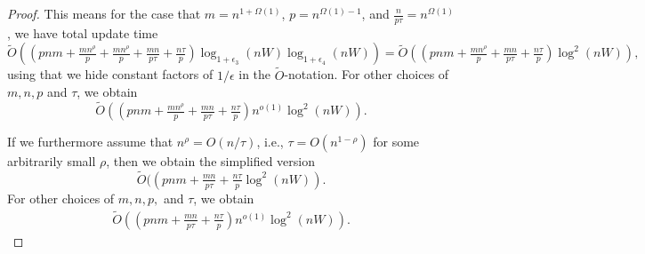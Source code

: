 \documentclass[11pt]{article}
\theoremstyle{definition}
\theoremstyle{remark}
\begin{document}
\begin{proof}
This means for the case that $m=n^{1+\Omega(1)}$, $p=n^{\Omega(1)-1}$, and $\tfrac{n}{p\tau}=n^{\Omega(1)}$, we have total update time
$$ \tilde O ((pnm + \tfrac{mn^\rho}{p}+\tfrac{mn^{\rho}}{p}  + \tfrac{m n }{p\tau}+\tfrac{n\tau}{ p})\log_{1+\epsilon_3}(nW)\log_{1+\epsilon_4}(nW)) = \tilde O ((pnm + \tfrac{mn^{\rho}}{p} + \tfrac{m n }{p\tau}+\tfrac{n\tau}{ p})\log^2(nW)), $$
using that we hide constant factors of $1/\epsilon$ in the $\tilde O$-notation. 
For other choices of $m,n,p$ and $\tau$, we obtain 
$$ \tilde O ((pnm + \tfrac{mn^{\rho}}{p} + \tfrac{m n }{p\tau}+\tfrac{n\tau}{ p})n^{o(1)}\log^2(nW)). $$

If we furthermore assume that $n^\rho = O(n/\tau)$, i.e., $\tau = O(n^{1-\rho})$ for some arbitrarily small $\rho$, then we obtain the simplified version
$$ \tilde O ((pnm +   \tfrac{m n }{p\tau}+\tfrac{n\tau}{ p}\log^2(nW)).$$
For other choices of $m,n,p,$ and $\tau$, we obtain 
\begin{align*}
     \tilde O ((pnm + \tfrac{m n }{p\tau}+\tfrac{n\tau}{ p})n^{o(1)}\log^2(nW)). 
\end{align*}
\end{proof}


    
\end{document}
